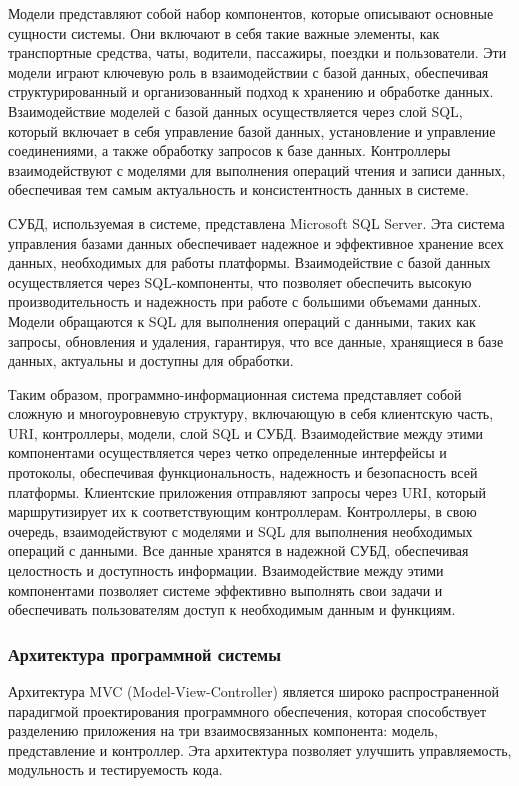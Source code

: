 Модели представляют собой набор компонентов, которые описывают основные сущности системы. Они включают в себя такие важные элементы, как транспортные средства, чаты, водители, пассажиры, поездки и пользователи. Эти модели играют ключевую роль в взаимодействии с базой данных, обеспечивая структурированный и организованный подход к хранению и обработке данных. Взаимодействие моделей с базой данных осуществляется через слой SQL, который включает в себя управление базой данных, установление и управление соединениями, а также обработку запросов к базе данных. Контроллеры взаимодействуют с моделями для выполнения операций чтения и записи данных, обеспечивая тем самым актуальность и консистентность данных в системе.

СУБД, используемая в системе, представлена Microsoft SQL Server. Эта система управления базами данных обеспечивает надежное и эффективное хранение всех данных, необходимых для работы платформы. Взаимодействие с базой данных осуществляется через SQL-компоненты, что позволяет обеспечить высокую производительность и надежность при работе с большими объемами данных. Модели обращаются к SQL для выполнения операций с данными, таких как запросы, обновления и удаления, гарантируя, что все данные, хранящиеся в базе данных, актуальны и доступны для обработки.

Таким образом, программно-информационная система представляет собой сложную и многоуровневую структуру, включающую в себя клиентскую часть, URI, контроллеры, модели, слой SQL и СУБД. Взаимодействие между этими компонентами осуществляется через четко определенные интерфейсы и протоколы, обеспечивая функциональность, надежность и безопасность всей платформы. Клиентские приложения отправляют запросы через URI, который маршрутизирует их к соответствующим контроллерам. Контроллеры, в свою очередь, взаимодействуют с моделями и SQL для выполнения необходимых операций с данными. Все данные хранятся в надежной СУБД, обеспечивая целостность и доступность информации. Взаимодействие между этими компонентами позволяет системе эффективно выполнять свои задачи и обеспечивать пользователям доступ к необходимым данным и функциям.

\subsubsection{Архитектура программной системы}

Архитектура MVC (Model-View-Controller) является широко распространенной парадигмой проектирования программного обеспечения, которая способствует разделению приложения на три взаимосвязанных компонента: модель, представление и контроллер. Эта архитектура позволяет улучшить управляемость, модульность и тестируемость кода.

